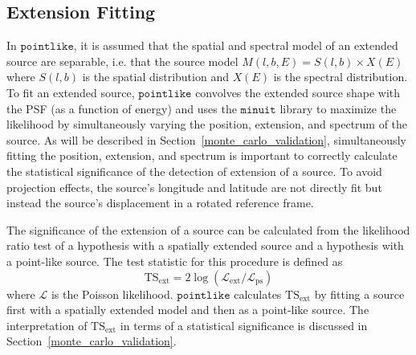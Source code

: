 \documentclass[12pt,preprint]{aastex}
\newcommand{\tsext}{{\ensuremath{\text{TS}_{\text{ext}}}}\xspace}
\newcommand{\likelihood}{\ensuremath{\mathcal{L}}\xspace}
\newcommand{\pointlike}{\ensuremath{\mathtt{pointlike}}\xspace}
\newcommand{\minuit}{\ensuremath{\mathtt{minuit}}\xspace}
\begin{document}
\subsection{Extension Fitting}
\label{extension_fitting}

In \pointlike, it is assumed that the spatial and spectral model
of an extended source are separable, i.e. that the source model
$M(l,b,E)=S(l,b)\times X(E)$ where $S(l,b)$ is the spatial distribution
and $X(E)$ is the spectral distribution.  To fit an extended source,
\pointlike convolves the extended source shape with the PSF (as a function
of energy) and uses the \minuit library \citep{minuit_documentation}
to maximize the likelihood by simultaneously varying the position,
extension, and spectrum of the source.  As will be described in
Section~\ref{monte_carlo_validation}, simultaneously fitting the
position, extension, and spectrum is important to correctly calculate
the statistical significance of the detection of extension of a source.
To avoid projection effects, the source's longitude and latitude are
not directly fit but instead the source's displacement in a rotated
reference frame.

The significance of the extension of a source can be calculated from the
likelihood ratio test of a hypothesis with a spatially extended source and
a hypothesis with a point-like source. The test statistic for this procedure
is defined as
\begin{equation}
  \tsext=2\log(\likelihood_\text{ext}/\likelihood_\text{ps}) 
\end{equation}
where \likelihood is the Poisson likelihood.
\pointlike calculates \tsext by fitting a source first with a spatially
extended model and then as a point-like source.  The interpretation
of \tsext in terms of a statistical significance is discussed in
Section~\ref{monte_carlo_validation}.
\end{document}
